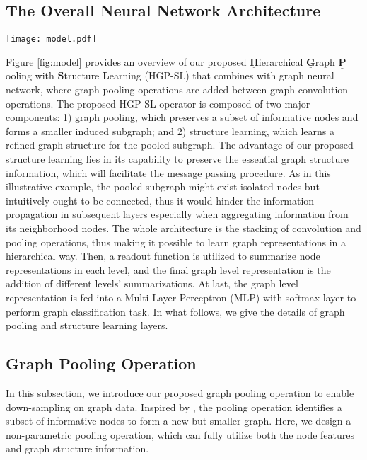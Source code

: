 \documentclass[letterpaper]{article} \usepackage{aaai20}  \usepackage{times}  \usepackage{helvet} \usepackage{courier}  \usepackage[hyphens]{url}  \usepackage{graphicx} \urlstyle{rm} \def\UrlFont{\rm}  \usepackage{graphicx}  \frenchspacing  \setlength{\pdfpagewidth}{8.5in}  \setlength{\pdfpageheight}{11in}
\begin{document}
\subsection{The Overall Neural Network Architecture}
\begin{figure*}
  \centering
  \texttt{[image: model.pdf]}
  \caption{Architecture of proposed HGP-SL operator combined with graph neural network. The dashed box demonstrates the workflow of HGP-SL, which involves graph pooling and structure learning. The learned edges are represented as dashed lines in the graph. This procedure (convolution and pooling operations) is repeated several times. Then, a readout function is applied to aggregate node representations to make a fixed size representation, which goes through MLP layers for graph classification.}
  \label{fig:model}
\end{figure*}
Figure \ref{fig:model} provides an overview of our proposed $\underline{\textbf{H}}$ierarchical $\underline{\textbf{G}}$raph $\underline{\textbf{P}}$ooling with $\underline{\textbf{S}}$tructure $\underline{\textbf{L}}$earning (HGP-SL) that combines with graph neural network, where graph pooling operations are added between graph convolution operations. The proposed HGP-SL operator is composed of two major components: 1) graph pooling, which preserves a subset of informative nodes and forms a smaller induced subgraph; and 2) structure learning, which learns a refined graph structure for the pooled subgraph. The advantage of our proposed structure learning lies in its capability to preserve the essential graph structure information, which will facilitate the message passing procedure. As in this illustrative example, the pooled subgraph might exist isolated nodes but intuitively ought to be connected, thus it would hinder the information propagation in subsequent layers especially when aggregating information from its neighborhood nodes. The whole architecture is the stacking of convolution and pooling operations, thus making it possible to learn graph representations in a hierarchical way. Then, a readout function is utilized to summarize node representations in each level, and the final graph level representation is the addition of different levels' summarizations. At last, the graph level representation is fed into a Multi-Layer Perceptron (MLP) with softmax layer to perform graph classification task. In what follows, we give the details of graph pooling and structure learning layers.

\subsection{Graph Pooling Operation}
In this subsection, we introduce our proposed graph pooling operation to enable down-sampling on graph data. Inspired by \cite{gao2019graph,lee2019self,gao2019ipool}, the pooling operation identifies a subset of informative nodes to form a new but smaller graph. Here, we design a non-parametric pooling operation, which can fully utilize both the node features and graph structure information. 
\end{document}
